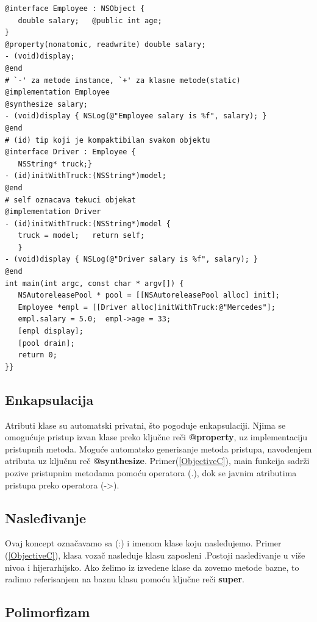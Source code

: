 \documentclass[a4paper]{article}
\begin{document}
{\begin{lstlisting}[caption={Primer koda u Objective C jeziku},frame=single, label=ObjectiveC]
@interface Employee : NSObject {
   double salary;	@public int age;
}
@property(nonatomic, readwrite) double salary; 
- (void)display;
@end
# `-' za metode instance, `+' za klasne metode(static)
@implementation Employee
@synthesize salary; 
- (void)display { NSLog(@"Employee salary is %f", salary); }
@end
# (id) tip koji je kompaktibilan svakom objektu
@interface Driver : Employee {
   NSString* truck;}
- (id)initWithTruck:(NSString*)model;
@end
# self oznacava tekuci objekat
@implementation Driver
- (id)initWithTruck:(NSString*)model {
   truck = model;	return self;
   }
- (void)display { NSLog(@"Driver salary is %f", salary); }
@end
int main(int argc, const char * argv[]) {
   NSAutoreleasePool * pool = [[NSAutoreleasePool alloc] init];
   Employee *empl = [[Driver alloc]initWithTruck:@"Mercedes"];
   empl.salary = 5.0;  empl->age = 33;
   [empl display];
   [pool drain];
   return 0;
}}
\end{lstlisting}

\subsection{Enkapsulacija}
\label{subsec:ObjCEnkapsulacija}

Atributi klase su automatski privatni, što pogoduje enkapsulaciji. Njima se omogućuje pristup izvan klase preko ključne reči \textbf{@property}, uz implementaciju pristupnih metoda. Moguće automatsko generisanje metoda pristupa, navođenjem atributa uz ključnu reč \textbf{@synthesize}. Primer(\ref{ObjectiveC}), main funkcija sadrži pozive pristupnim metodama pomoću operatora (.), dok se javnim atributima pristupa preko operatora (->).

\subsection{Nasleđivanje}
\label{subsec:ObjCNasledjivanje}

Ovaj koncept označavamo sa (:) i imenom klase koju nasleđujemo. Primer (\ref{ObjectiveC}), klasa vozač nasleđuje klasu zaposleni .Postoji nasleđivanje u više nivoa i hijerarhijsko. Ako želimo iz izvedene klase da zovemo metode bazne, to radimo referisanjem na baznu klasu pomoću ključne reči \textbf{super}.

\subsection{Polimorfizam}
\label{subsec:ObjCPolimorfizam}

}
\end{document}
